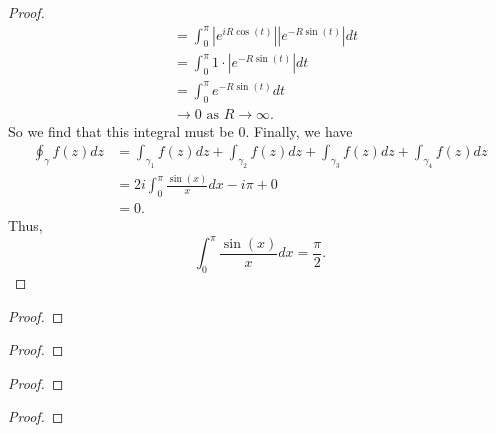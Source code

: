 \documentclass[12pt]{article}
\newenvironment{statement}[2][Statement]{\begin{trivlist}
\item[\hskip \labelsep {\bfseries #1}\hskip \labelsep {\bfseries #2.}]}{\end{trivlist}}
\begin{document}
\begin{proof}
\begin{align*}
                                                                        &= \int^{\pi}_0 \left \lvert e^{iR\cos(t)} \right\rvert \left\lvert e^{-R\sin(t)}\right\rvert dt \\
                                                                        &= \int^{\pi}_0 1 \cdot \left\lvert e^{-R\sin(t)} \right\rvert dt \\
                                                                        &= \int^{\pi}_0 e^{-R\sin(t)}dt \\
                                                                        & \to 0 \text{ as } R \to \infty .
  \end{align*}
  So we find that this integral must be 0.
  Finally, we have 
  \begin{align*} 
    \oint_{\gamma} f(z)dz &= \int_{\gamma_1} f(z)dz + \int_{\gamma_2} f(z)dz + \int_{\gamma_3} f(z)dz +\int_{\gamma_4} f(z)dz \\
                          &= 2i \int^{\pi}_0 \frac{\sin(x)}{x} dx - i\pi + 0 \\
                          &= 0.
  \end{align*}
  Thus, 
  \begin{equation*}
    \int^{\pi}_0 \frac{\sin(x)}{x} dx = \frac{\pi}{2}.
  \end{equation*}
\end{proof}

\begin{statement}[Problem]{1}

\end{statement}
\begin{proof}

\end{proof}

\begin{statement}[Problem]{1}

\end{statement}
\begin{proof}

\end{proof}

\begin{statement}[Problem]{1}

\end{statement}
\begin{proof}

\end{proof}


\begin{statement}[Problem]{1}

\end{statement}
\begin{proof}

\end{proof}
\end{document}
